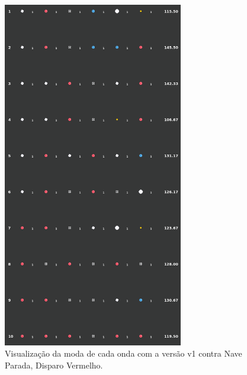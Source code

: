 \begin{figure}[H]
  \centering
  \includegraphics[width=0.7\textwidth]{figuras/ss/ss_redstill_ai_mode_1_1.png}
  \caption{Visualização da moda de cada onda com a versão v1 contra Nave Parada, Disparo Vermelho.}
  \label{fig:ss-moda-rs-1-1}
\end{figure}

